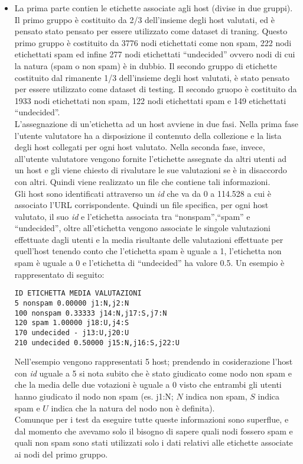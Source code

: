 \begin{itemize}
 \item La prima parte contien le etichette associate agli host (divise in due gruppi). Il primo gruppo è costituito da 2/3 dell'insieme degli host valutati, ed è pensato stato pensato per essere utilizzato come dataset di traning. Questo primo gruppo è costituito da 3776 nodi etichettati come non spam, 222 nodi etichettati spam ed infine 277 nodi etichettati ``undecided'' ovvero nodi di cui la natura (spam o non spam) è in dubbio. Il secondo gruppo di etichette costituito dal rimanente 1/3 dell'insieme degli host valutati, è stato pensato per essere utilizzato come dataset di testing. Il secondo gruopo è costituito da 1933 nodi etichettati non spam, 122 nodi etichettati spam e 149 etichettati ``undecided''.\\
 L'assegnazione di un'etichetta ad un host avviene in due fasi. Nella prima fase l'utente valutatore ha a disposizione il contenuto della collezione e la lista degli host collegati per ogni host valutato. Nella seconda fase, invece, all'utente valutatore vengono fornite l'etichette  assegnate da altri utenti ad un host e gli viene chiesto di rivalutare le sue valutazioni se è in disaccordo con altri. Quindi viene realizzato un file che contiene tali informazioni.\\ 
 Gli host sono identificati attraverso un \textit{id} che va da 0 a 114.528 a cui è associato l'URL corrispondente. Quindi un file specifica, per ogni host valutato, il suo \textit{id}  e l'etichetta associata tra ``nonspam'',``spam'' e ``undecided'', oltre all'etichetta vengono associate le singole valutazioni effettuate dagli utenti e la media risultante delle valutazioni effettuate per quell'host tenendo conto che l'etichetta spam è uguale a 1, l'etichetta non spam è uguale a 0 e l'etichetta di ``undecided'' ha valore 0.5. Un esempio è rappresentato di seguito: 
 \begin{lstlisting}[frame=trbl,postbreak=\space, breakindent=5pt, breaklines]
ID ETICHETTA MEDIA VALUTAZIONI
5 nonspam 0.00000 j1:N,j2:N
100 nonspam 0.33333 j14:N,j17:S,j7:N
120 spam 1.00000 j18:U,j4:S
170 undecided - j13:U,j20:U
210 undecided 0.50000 j15:N,j16:S,j22:U
\end{lstlisting}
Nell'esempio vengono rappresentati 5 host; prendendo in cosiderazione l'host con \textit{id} uguale a 5 si nota subito che è stato giudicato come nodo non spam e che la media delle due votazioni è uguale a 0 visto che entrambi gli utenti hanno giudicato il nodo non spam (es. j1:N; \(N\) indica non spam, \(S\) indica spam e \(U\) indica che la natura del nodo non è definita).\\ 
Comunque per i test da eseguire tutte queste informazioni sono superflue, e dal momento che avevamo solo il bisogno di sapere quali nodi fossero spam e quali non spam sono stati utilizzati solo i dati relativi alle etichette associate ai nodi del primo gruppo.


\end{itemize}
